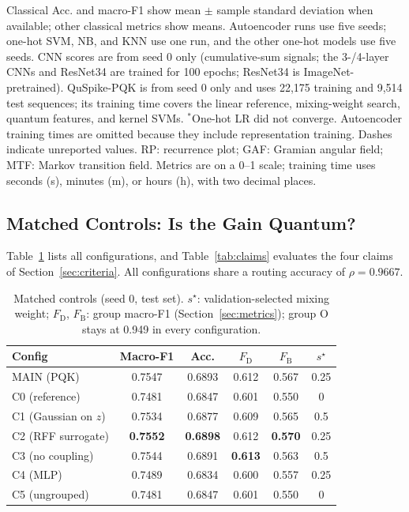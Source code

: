 \documentclass[conference]{IEEEtran}
\begin{document}
\begin{table}[!t]
    \begin{minipage}{\textwidth}
        \footnotesize
        Classical Acc. and macro-F1 show mean $\pm$ sample standard deviation when available; other classical metrics show means. Autoencoder runs use five seeds; one-hot SVM, NB, and KNN use one run, and the other one-hot models use five seeds. CNN scores are from seed 0 only (cumulative-sum signals; the 3-/4-layer CNNs and ResNet34 are trained for 100 epochs; ResNet34 is ImageNet-pretrained). QuSpike-PQK is from seed 0 only and uses 22,175 training and 9,514 test sequences; its training time covers the linear reference, mixing-weight search, quantum features, and kernel SVMs. $^{*}$One-hot LR did not converge. Autoencoder training times are omitted because they include representation training. Dashes indicate unreported values. RP: recurrence plot; GAF: Gramian angular field; MTF: Markov transition field. Metrics are on a 0--1 scale; training time uses seconds (s), minutes (m), or hours (h), with two decimal places.
    \end{minipage}
\end{table}

\subsection{Matched Controls: Is the Gain Quantum?}
\label{sec:res-controls}

Table~\ref{tab:control-results} lists all configurations, and Table~\ref{tab:claims} evaluates the four claims of Section~\ref{sec:criteria}. All configurations share a routing accuracy of $\rho=0.9667$.

\begin{table}[!t]
    \centering
    \caption{Matched controls (seed 0, test set). $s^\star$: validation-selected mixing weight; $F_{\mathrm{D}}$, $F_{\mathrm{B}}$: group macro-F1 (Section~\ref{sec:metrics}); group O stays at 0.949 in every configuration.}
    \label{tab:control-results}
    \footnotesize
    \setlength{\tabcolsep}{4pt}
    \renewcommand{\arraystretch}{1.12}
    \begin{tabular*}{\columnwidth}{@{\extracolsep{\fill}}lccccc@{}}
        \toprule
        Config & Macro-F1 & Acc. & $F_{\mathrm{D}}$ & $F_{\mathrm{B}}$ & $s^\star$ \\
        \midrule
        \rowcolor{blue!10} MAIN (PQK) & 0.7547 & 0.6893 & 0.612 & 0.567 & 0.25 \\
        C0 (reference) & 0.7481 & 0.6847 & 0.601 & 0.550 & 0 \\
        C1 (Gaussian on $z$) & 0.7534 & 0.6877 & 0.609 & 0.565 & 0.5 \\
        C2 (RFF surrogate) & \textbf{0.7552} & \textbf{0.6898} & 0.612 & \textbf{0.570} & 0.25 \\
        C3 (no coupling) & 0.7544 & 0.6891 & \textbf{0.613} & 0.563 & 0.5 \\
        C4 (MLP) & 0.7489 & 0.6834 & 0.600 & 0.557 & 0.25 \\
        C5 (ungrouped) & 0.7481 & 0.6847 & 0.601 & 0.550 & 0 \\
        \bottomrule
    \end{tabular*}
\end{table}
\end{document}
